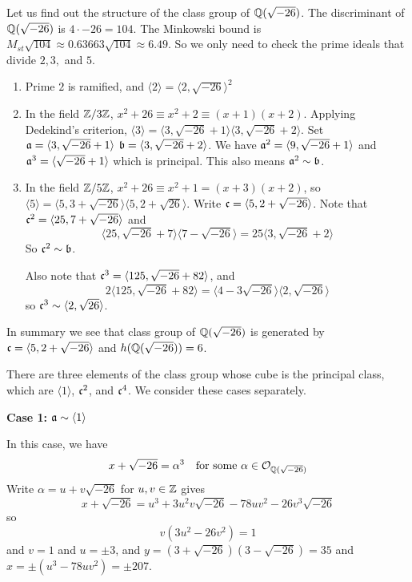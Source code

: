 Let us find out the structure of the class group of $\mathbb{Q}(\sqrt{-26})$.
The discriminant of $\mathbb{Q}(\sqrt{-26})$ is $4 \cdot -26 = 104$.
The Minkowski bound is $M_{st} \sqrt{104} \approx 0.63663 \sqrt{104} \approx 6.49$. 
So we only need to check the prime ideals that divide $2, 3,$ and $5$.
\begin{enumerate}
	\item Prime $2$ is ramified, and $\langle 2 \rangle = \langle 2, \sqrt{-26}\rangle^2$
	\item In the field $\mathbb{Z} / 3\mathbb{Z}$, $x^2 + 26 \equiv x^2 +2 \equiv (x+1)(x+2)$. Applying Dedekind's criterion, $\langle 3 \rangle = \langle 3, \sqrt{-26} + 1\rangle \langle 3, \sqrt{-26} + 2\rangle$. 
		Set $\mathfrak{a} = \langle 3, \sqrt{-26} + 1\rangle$ $\mathfrak{b} = \langle 3, \sqrt{-26} + 2\rangle$.
		We have $\mathfrak{a}^2 = \langle 9, \sqrt{-26} + 1\rangle$ and $\mathfrak{a}^3 = \langle \sqrt{-26} + 1\rangle$ which is principal.
		This also means $\mathfrak{a}^2 \sim \mathfrak{b}$.
	\item In the field $\mathbb{Z} / 5\mathbb{Z}$, $x^2 + 26 \equiv x^2 + 1 = (x+3)(x+2)$, so $\langle 5\rangle = \langle 5, 3 + \sqrt{-26}\rangle \langle 5, 2 + \sqrt{ 26}\rangle$.
		Write $ \mathfrak{c} = \langle 5, 2 + \sqrt{-26}\rangle $. Note that $\mathfrak{c}^2= \langle 25, 7 + \sqrt{-26} \rangle$ 
		and 
		$$
		\langle 25, \sqrt{-26} + 7\rangle \langle 7 - \sqrt{-26}\rangle = 25 \langle 3, \sqrt{-26} + 2\rangle 
		$$
		So $\mathfrak{c}^2 \sim \mathfrak{b}$.
		
		Also note that $\mathfrak{c}^3 = \langle 125, \sqrt{-26} + 82\rangle$, and 
		$$
		2 \langle 125, \sqrt{-26} + 82\rangle = \langle 4 - 3 \sqrt{-26 }\rangle \langle 2, \sqrt{-26}\rangle
		$$
		so $\mathfrak{c}^3 \sim \langle 2, \sqrt{26}\rangle$.
\end{enumerate}
In summary we see that class group of $\mathbb{Q}(\sqrt{-26})$ is generated by $\mathfrak{c} = \langle 5, 2 + \sqrt{-26}\rangle $ and $h(\mathbb{Q}(\sqrt{-26})) = 6$.

There are three elements of the class group whose cube is the principal class, which are $\langle 1 \rangle$, $\mathfrak{c}^2$, and $\mathfrak{c}^4$.
We consider these cases separately.

\textbf{Case 1: $\mathfrak{a} \sim \langle 1 \rangle$}

In this case, we have 
$$
x + \sqrt{-26} = \alpha^3 \quad \text{for some } \alpha \in \mathcal{O}_{\mathbb{Q}(\sqrt{-26})}
$$
Write $\alpha = u + v \sqrt{-26} $ for $u, v \in \mathbb{Z}$ gives
$$
x + \sqrt{-26} = u^3 + 3 u^2 v \sqrt{-26} - 78 uv^2 - 26 v^3 \sqrt{-26}
$$
so 
$$
v(3 u^2 - 26 v^2) = 1
$$
and $v =  1$ and $u = \pm 3$, and $y = (3 + \sqrt{-26}) (3- \sqrt{-26}) = 35$ and $x = \pm (u^3 - 78 uv^2) = \pm 207$.

